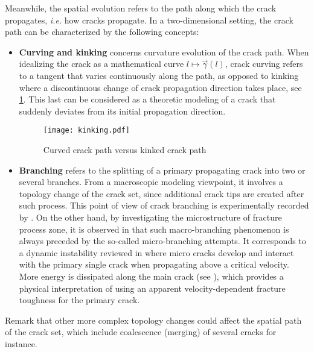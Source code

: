 Meanwhile, the spatial evolution refers to the path along which the crack propagates, \emph{i.e.} how cracks propagate. In a two-dimensional setting, the crack path can be characterized by the following concepts:
\begin{itemize}
\item \textbf{Curving and kinking} concerns curvature evolution of the crack path. When idealizing the crack as a mathematical curve $l\mapsto\vec{\gamma}(l)$, crack curving refers to a tangent that varies continuously along the path, as opposed to kinking where a discontinuous change of crack propagation direction takes place, see \cref{fig:kink}. This last can be considered as a theoretic modeling of a crack that suddenly deviates from its initial propagation direction.
\begin{figure}[htbp]
\centering
\texttt{[image: kinking.pdf]}
\caption{Curved crack path versus kinked crack path} \label{fig:kink}
\end{figure}

\item \textbf{Branching} refers to the splitting of a primary propagating crack into two or several branches. From a macroscopic modeling viewpoint, it involves a topology change of the crack set, since additional crack tips are created after such process. This point of view of crack branching is experimentally recorded by \cite{Schardin:2012}. On the other hand, by investigating the microstructure of fracture process zone, it is observed in \cite{Ravi-ChandarKnauss:1984,Ravi-ChandarKnauss:1984a,SharonGrossFineberg:1995,SharonFineberg:1996} that such macro-branching phenomenon is always preceded by the so-called micro-branching attempts. It corresponds to a dynamic instability reviewed in \cite{FinebergMarder:1999} where micro cracks develop and interact with the primary single crack when propagating above a critical velocity. More energy is dissipated along the main crack (see \cite{SharonGrossFineberg:1996}), which provides a physical interpretation of using an apparent velocity-dependent fracture toughness for the primary crack.
\end{itemize}
Remark that other more complex topology changes could affect the spatial path of the crack set, which include coalescence (merging) of several cracks for instance.

